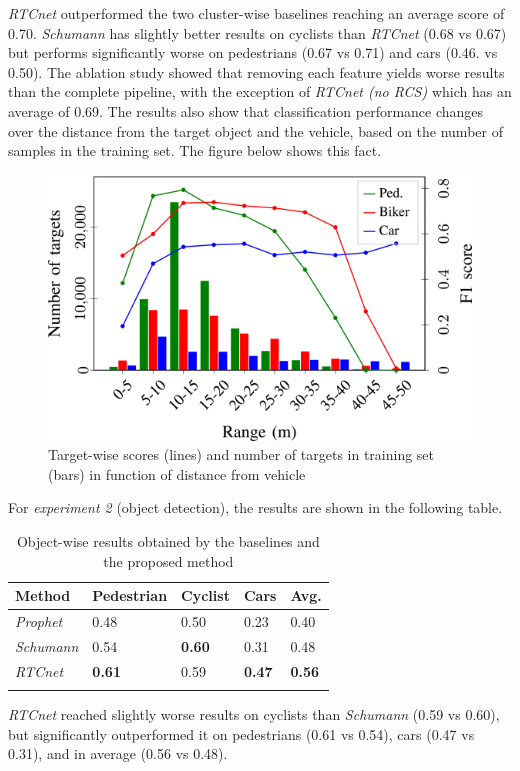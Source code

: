 \emph{RTCnet} outperformed the two cluster-wise baselines reaching an
average score of 0.70. \emph{Schumann} has slightly better results on
cyclists than \emph{RTCnet} (0.68 vs 0.67) but performs significantly
worse on pedestrians (0.67 vs 0.71) and cars (0.46. vs 0.50). The
ablation study showed that removing each feature yields worse results
than the complete pipeline, with the exception of \emph{RTCnet (no RCS)}
which has an average of 0.69. The results also show that classification
performance changes over the distance from the target object and the
vehicle, based on the number of samples in the training set. The figure
below shows this fact.

\begin{figure}[h!]
\centering
\includegraphics[width=0.85\linewidth]{images/resultsdistance.png}
\caption{Target-wise scores (lines) and number of targets in training set (bars) in function of distance from vehicle}
\end{figure}

For \emph{experiment 2} (object detection), the results are shown in the
following table.

\begin{longtable}[]{@{}lllll@{}}
\toprule
\textbf{Method} & \textbf{Pedestrian} & \textbf{Cyclist} & \textbf{Cars}
& \textbf{Avg.}\tabularnewline
\midrule
\endhead
\emph{Prophet} & 0.48 & 0.50 & 0.23 & 0.40\tabularnewline
\emph{Schumann} & 0.54 & \textbf{0.60} & 0.31 & 0.48\tabularnewline
\emph{RTCnet} & \textbf{0.61} & 0.59 & \textbf{0.47} &
\textbf{0.56}\tabularnewline
\bottomrule
\caption{Object-wise results obtained by the baselines and the proposed method}
\end{longtable}

\emph{RTCnet} reached slightly worse results on cyclists than
\emph{Schumann} (0.59 vs 0.60), but significantly outperformed it on
pedestrians (0.61 vs 0.54), cars (0.47 vs 0.31), and in average (0.56 vs
0.48).

